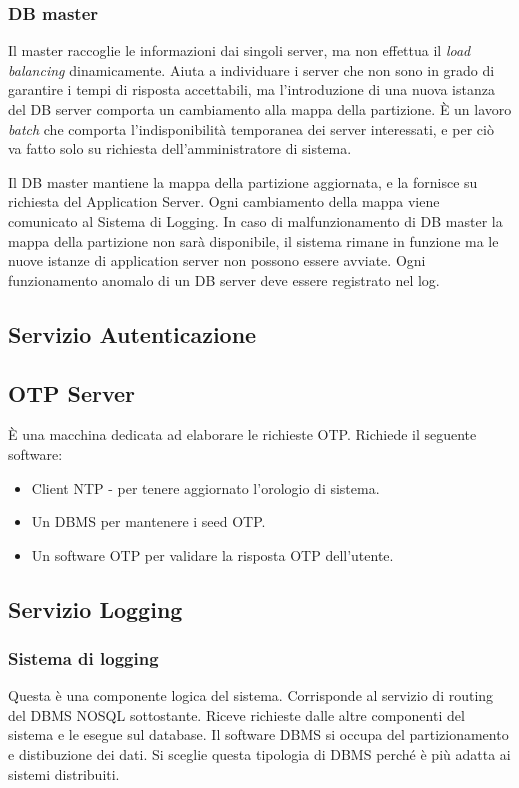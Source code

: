\subsubsection{DB master}
Il master raccoglie le informazioni dai singoli server, ma non effettua il \emph{load balancing} dinamicamente.
Aiuta a individuare i server che non sono in grado di garantire i tempi di risposta accettabili, ma l'introduzione di una nuova istanza del DB server comporta un cambiamento alla mappa della partizione. \`E un lavoro \emph{batch} che comporta l'indisponibilit\`a temporanea dei server interessati, e per ci\`o va fatto solo su richiesta dell'amministratore di sistema.

Il DB master mantiene la mappa della partizione aggiornata, e la fornisce su richiesta del Application Server.
Ogni cambiamento della mappa viene comunicato al Sistema di Logging.
In caso di malfunzionamento di DB master la mappa della partizione non sar\`a disponibile, il sistema rimane in funzione ma le nuove istanze di application server non possono essere avviate.
Ogni funzionamento anomalo di un DB server deve essere registrato nel log.
\subsection{Servizio Autenticazione}
\subsection{OTP Server}
\`E una macchina dedicata ad elaborare le richieste OTP. Richiede il seguente software:
\begin{itemize}
    \item Client NTP - per tenere aggiornato l'orologio di sistema.
    \item Un DBMS per mantenere i seed OTP.
    \item Un software OTP per validare la risposta OTP dell'utente.
\end{itemize}

\subsection{Servizio Logging}
\subsubsection{Sistema di logging}
Questa \`e una componente logica del sistema.
Corrisponde al servizio di routing del DBMS NOSQL sottostante.
Riceve richieste dalle altre componenti del sistema e le esegue sul database.
Il software DBMS si occupa del partizionamento e distibuzione dei dati.
Si sceglie questa tipologia di DBMS perch\'e \`e pi\`u adatta ai sistemi distribuiti.

